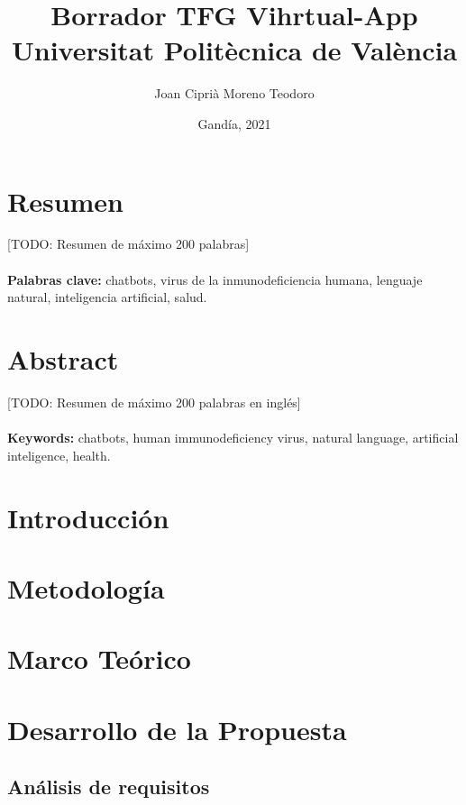 \documentclass[11pt,a4paper]{book}
\title{
{Borrador TFG Vihrtual-App}\\
{\large Universitat Politècnica de València}\\
}
\author{Joan Ciprià Moreno Teodoro}
\date{Gandía, 2021}
\begin{document}
\maketitle

\chapter*{Resumen}
[TODO: Resumen de máximo 200 palabras]
\\
\\
\textbf{Palabras clave:} chatbots, virus de la inmunodeficiencia humana, lenguaje natural, inteligencia artificial, salud.

\chapter*{Abstract}
[TODO: Resumen de máximo 200 palabras en inglés]
\\
\\
\textbf{Keywords:} chatbots, human immunodeficiency virus, natural language, artificial inteligence, health. 

\tableofcontents

{\listoffigures \let\cleardoublepage\clearpage \listoftables}


\chapter{Introducción}


\chapter{Metodología}


\chapter{Marco Teórico}


\chapter{Desarrollo de la Propuesta}

\section{Análisis de requisitos}


\end{document}

